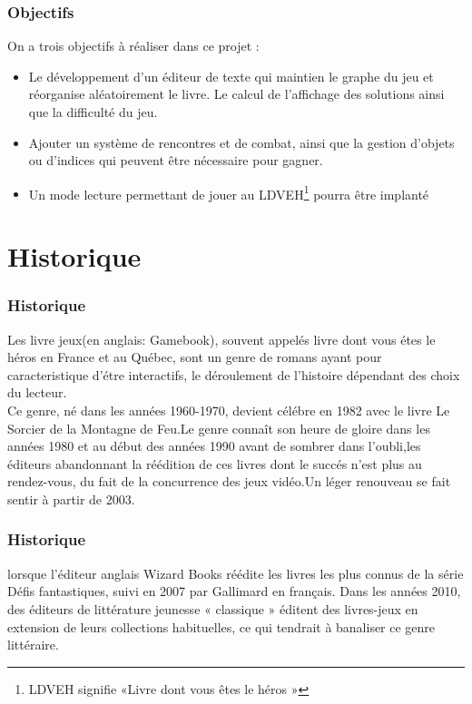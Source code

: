 \documentclass{beamer}
\begin{document}
\begin{frame}
\frametitle{Objectifs}

On a trois objectifs à réaliser dans ce projet :\\

\begin{itemize}
	\item Le développement d'un éditeur de texte qui maintien le graphe du jeu et réorganise aléatoirement le livre. Le calcul de l'affichage des solutions ainsi que la difficulté du jeu.
	\item Ajouter un système de rencontres et de combat, ainsi que la gestion d’objets ou d’indices qui peuvent être nécessaire pour gagner.
	\item Un mode lecture permettant de jouer au LDVEH\footnote{LDVEH signifie «Livre dont vous êtes le héros »} pourra être implanté
\end{itemize}
\end{frame}
\section{\textbf{Historique}}

\begin{frame}
\frametitle{Historique}
Les livre jeux(en anglais: Gamebook), souvent appelés livre dont vous étes le héros en France et au Québec, sont un genre de romans ayant pour caracteristique d'étre interactifs, le déroulement de l'histoire dépendant des choix du lecteur.\\
Ce genre, né dans les années 1960-1970, devient célébre en 1982 avec le livre Le Sorcier de la Montagne de Feu.Le genre connaît son heure de gloire dans les années 1980 et au début des années 1990 avant de sombrer dans l'oubli,les éditeurs abandonnant la réédition de ces livres dont le succés n'est plus au rendez-vous, du fait de la concurrence des jeux vidéo.Un léger renouveau se fait sentir à partir de 2003.

\end{frame}

\begin{frame}
\frametitle{Historique}
lorsque l'éditeur anglais Wizard Books réédite les livres les plus connus de la série Défis fantastiques, suivi en 2007 par Gallimard en français. Dans les années 2010, des éditeurs de littérature jeunesse « classique » éditent des livres-jeux en extension de leurs collections habituelles, ce qui tendrait à banaliser ce genre littéraire.\\ 
\end{frame}
\end{document}
